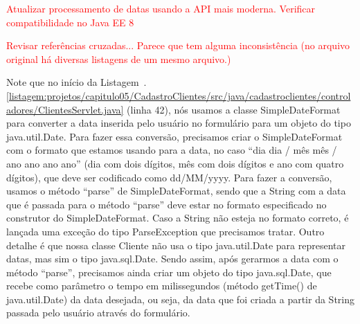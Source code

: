  
 



\textcolor{red}{Atualizar processamento de datas usando a API mais moderna. Verificar compatibilidade no Java EE 8}

\textcolor{red}{Revisar referências cruzadas... Parece que tem alguma inconsistência (no arquivo original há diversas listagens de um mesmo arquivo.)}



Note que no início da Listagem~\thechapter.\ref{listagem:projetos/capitulo05/CadastroClientes/src/java/cadastroclientes/controladores/ClientesServlet.java} (linha 42), nós usamos a classe SimpleDateFormat para converter a data inserida pelo usuário no formulário para um objeto do tipo java.util.Date. Para fazer essa conversão, precisamos criar o SimpleDateFormat com o formato que estamos usando para a data, no caso ``dia dia / mês mês / ano ano ano ano'' (dia com dois dígitos, mês com dois dígitos e ano com quatro dígitos), que deve ser codificado como dd/MM/yyyy.  Para fazer a conversão, usamos o método ``parse'' de SimpleDateFormat, sendo que a String com a data que é passada para o método ``parse'' deve estar no formato especificado no construtor do SimpleDateFormat. Caso a String não esteja no formato correto, é lançada uma exceção do tipo ParseException que precisamos tratar.
Outro detalhe é que nossa classe Cliente não usa o tipo java.util.Date para representar datas, mas sim o tipo java.sql.Date. Sendo assim, após gerarmos a data com o método ``parse'', precisamos ainda criar um objeto do tipo java.sql.Date, que recebe como parâmetro o tempo em milissegundos (método getTime() de java.util.Date) da data desejada, ou seja, da data que foi criada a partir da String passada pelo usuário através do formulário.

